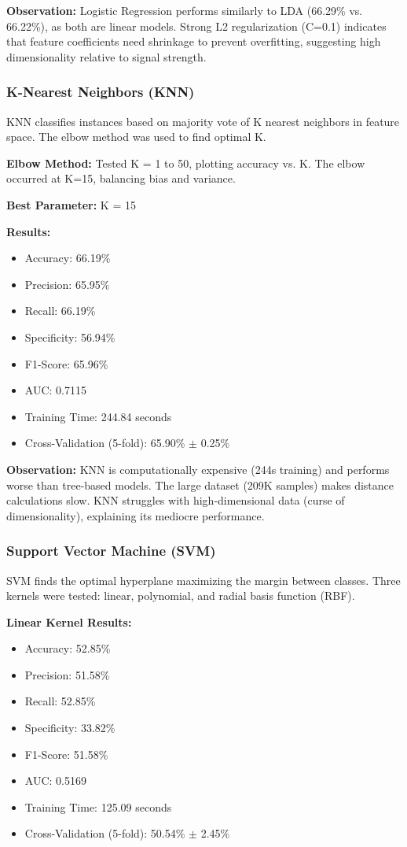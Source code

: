 \documentclass[12pt,man]{apa7}
\begin{document}
\textbf{Observation:} Logistic Regression performs similarly to LDA (66.29\% vs. 66.22\%), as both are linear models. Strong L2 regularization (C=0.1) indicates that feature coefficients need shrinkage to prevent overfitting, suggesting high dimensionality relative to signal strength.

\subsubsection{K-Nearest Neighbors (KNN)}

KNN classifies instances based on majority vote of K nearest neighbors in feature space. The elbow method was used to find optimal K.

\textbf{Elbow Method:} Tested K = 1 to 50, plotting accuracy vs. K. The elbow occurred at K=15, balancing bias and variance.

\textbf{Best Parameter:} K = 15

\textbf{Results:}
\begin{itemize}
    \item Accuracy: 66.19\%
    \item Precision: 65.95\%
    \item Recall: 66.19\%
    \item Specificity: 56.94\%
    \item F1-Score: 65.96\%
    \item AUC: 0.7115
    \item Training Time: 244.84 seconds
    \item Cross-Validation (5-fold): 65.90\% $\pm$ 0.25\%
\end{itemize}

\textbf{Observation:} KNN is computationally expensive (244s training) and performs worse than tree-based models. The large dataset (209K samples) makes distance calculations slow. KNN struggles with high-dimensional data (curse of dimensionality), explaining its mediocre performance.

\subsubsection{Support Vector Machine (SVM)}

SVM finds the optimal hyperplane maximizing the margin between classes. Three kernels were tested: linear, polynomial, and radial basis function (RBF).

\textbf{Linear Kernel Results:}
\begin{itemize}
    \item Accuracy: 52.85\%
    \item Precision: 51.58\%
    \item Recall: 52.85\%
    \item Specificity: 33.82\%
    \item F1-Score: 51.58\%
    \item AUC: 0.5169
    \item Training Time: 125.09 seconds
    \item Cross-Validation (5-fold): 50.54\% $\pm$ 2.45\%
\end{itemize}
\end{document}
